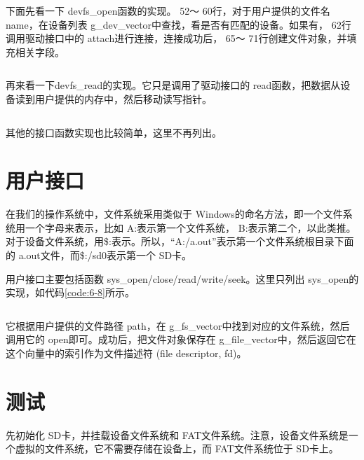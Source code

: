\documentclass[main.tex]{subfiles}
\begin{document}
\begin{CJK*}{UTF8}{song}
\par
下面先看一下 devfs\_\-open函数的实现。 52～ 60行，对于用户提供的文件名 name，在设备列表 g\_dev\_vector中查找，看是否有匹配的设备。如果有， 62行调用驱动接口中的 attach进行连接，连接成功后， 65～ 71行创建文件对象，并填充相关字段。

\begin{code}
\label{code:6-6}
\inputminted[firstline=43,lastline=74,linenos,numbersep=5pt,frame=lines,framesep=2mm]{c}{src/chapter06/kernel/devfs.c}
\end{code}

\noindent
再来看一下devfs\_\-read的实现。它只是调用了驱动接口的 read函数，把数据从设备读到用户提供的内存中，然后移动读写指针。

\begin{code}
\label{code:6-7}
\inputminted[firstline=83,lastline=98,linenos,numbersep=5pt,frame=lines,framesep=2mm]{c}{src/chapter06/kernel/devfs.c}
\end{code}

\noindent
其他的接口函数实现也比较简单，这里不再列出。

\section{用户接口}
在我们的操作系统中，文件系统采用类似于 Windows的命名方法，即一个文件系统用一个字母来表示，比如 A:表示第一个文件系统， B:表示第二个，以此类推。对于设备文件系统，用\$:表示。所以，“A:/a.out”表示第一个文件系统根目录下面的 a.out文件，而\$:/sd0表示第一个 SD卡。

\par
用户接口主要包括函数 sys\_open/\-close/\-read/\-write/\-seek。这里只列出 sys\_\-open的实现，如代码\ref{code:6-8}所示。

\begin{code}
\label{code:6-8}
\inputminted[firstline=6,lastline=45,linenos,numbersep=5pt,frame=lines,framesep=2mm]{c}{src/chapter06/kernel/file.c}
\end{code}

\noindent
它根据用户提供的文件路径 path，在 g\_fs\_vector中找到对应的文件系统，然后调用它的 open即可。成功后，把文件对象保存在 g\_file\_vector中，然后返回它在这个向量中的索引作为文件描述符 (file descriptor, fd)。

\section{测试}
先初始化 SD卡，并挂载设备文件系统和 FAT文件系统。注意，设备文件系统是一个虚拟的文件系统，它不需要存储在设备上，而 FAT文件系统位于 SD卡上。


\end{CJK*}
\end{document}

